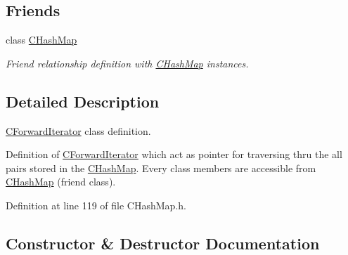 \subsection*{Friends}
\begin{DoxyCompactItemize}
\item 
class \hyperlink{class_c_hash_map_1_1_c_forward_iterator_ae4f62cde73f2b1bf2c70f84caece63e5}{C\+Hash\+Map}
\begin{DoxyCompactList}\small\item\em Friend relationship definition with \hyperlink{class_c_hash_map}{C\+Hash\+Map} instances. \end{DoxyCompactList}\end{DoxyCompactItemize}


\subsection{Detailed Description}
\hyperlink{class_c_hash_map_1_1_c_forward_iterator}{C\+Forward\+Iterator} class definition. 

Definition of \hyperlink{class_c_hash_map_1_1_c_forward_iterator}{C\+Forward\+Iterator} which act as pointer for traversing thru the all pairs stored in the \hyperlink{class_c_hash_map}{C\+Hash\+Map}. Every class members are accessible from \hyperlink{class_c_hash_map}{C\+Hash\+Map} (friend class). 

Definition at line 119 of file C\+Hash\+Map.\+h.



\subsection{Constructor \& Destructor Documentation}
\mbox{\label{class_c_hash_map_1_1_c_forward_iterator_a1e27b10a503e0bdddce6bacdd91d16e3}} 
